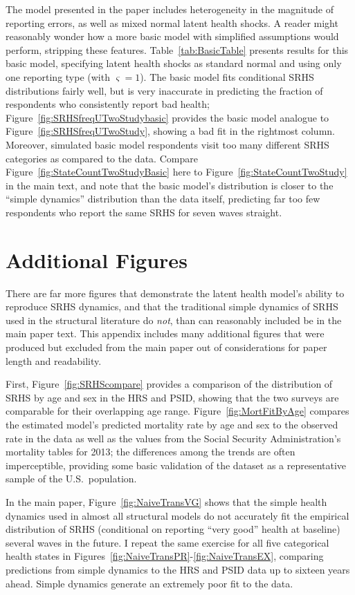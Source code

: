 \documentclass[12pt,pdftex,letterpaper]{article}
\begin{document}
The model presented in the paper includes heterogeneity in the magnitude of reporting errors, as well as mixed normal latent health shocks. A reader might reasonably wonder how a more basic model with simplified assumptions would perform, stripping these features. Table~\ref{tab:BasicTable} presents results for this basic model, specifying latent health shocks as standard normal and using only one reporting type (with $\varsigma=1$). The basic model fits conditional SRHS distributions fairly well, but is very inaccurate in predicting the fraction of respondents who consistently report bad health; Figure~\ref{fig:SRHSfreqUTwoStudybasic} provides the basic model analogue to Figure~\ref{fig:SRHSfreqUTwoStudy}, showing a bad fit in the rightmost column. Moreover, simulated basic model respondents visit too many different SRHS categories as compared to the data. Compare Figure~\ref{fig:StateCountTwoStudyBasic} here to Figure~\ref{fig:StateCountTwoStudy} in the main text, and note that the basic model's distribution is closer to the ``simple dynamics'' distribution than the data itself, predicting far too few respondents who report the same SRHS for seven waves straight.


\section{Additional Figures}\label{app:MoreFigs}

There are far more figures that demonstrate the latent health model's ability to reproduce SRHS dynamics, and that the traditional simple dynamics of SRHS used in the structural literature do \textit{not}, than can reasonably included be in the main paper text. This appendix includes many additional figures that were produced but excluded from the main paper out of considerations for paper length and readability.

First, Figure~\ref{fig:SRHScompare} provides a comparison of the distribution of SRHS by age and sex in the HRS and PSID, showing that the two surveys are comparable for their overlapping age range. Figure~\ref{fig:MortFitByAge} compares the estimated model's predicted mortality rate by age and sex to the observed rate in the data as well as the values from the Social Security Administration's mortality tables for 2013; the differences among the trends are often imperceptible, providing some basic validation of the dataset as a representative sample of the U.S.\ population.

In the main paper, Figure~\ref{fig:NaiveTransVG} shows that the simple health dynamics used in almost all structural models do not accurately fit the empirical distribution of SRHS (conditional on reporting ``very good'' health at baseline) several waves in the future. I repeat the same exercise for all five categorical health states in Figures~\ref{fig:NaiveTransPR}-\ref{fig:NaiveTransEX}, comparing predictions from simple dynamics to the HRS and PSID data up to sixteen years ahead. Simple dynamics generate an extremely poor fit to the data.
\end{document}
